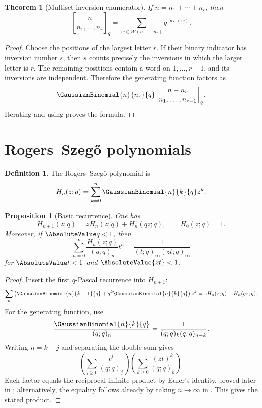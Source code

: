 \documentclass[11pt,a4paper,oneside,openany]{book}
\newtheorem{theorem}{Theorem}[chapter]
\newtheorem{proposition}[proposition]{Proposition}
\theoremstyle{definition}
\newtheorem{definition}[definition]{Definition}
\theoremstyle{remark}
\newcommand{\inv}{\operatorname{inv}}
\begin{document}
\begin{theorem}[Multiset inversion enumerator]\label{thm:qmult-inversions}
If $n=n_1+\cdots+n_r$, then
\[
 \genfrac{[}{]}{0pt}{}{n}{n_1,\dots,n_r}_q
 =\sum_{w\in\mathcal W(n_1,\dots,n_r)}q^{\inv(w)}.
\]
\end{theorem}

\begin{proof}
Choose the positions of the largest letter $r$.  If their binary indicator has inversion number $s$, then $s$ counts precisely the inversions in which the larger letter is $r$.  The remaining positions contain a word on $1,\dots,r-1$, and its inversions are independent.  Therefore the generating function factors as
\[
 \GaussianBinomial{n}{n_r}{q}
 \genfrac{[}{]}{0pt}{}{n-n_r}{n_1,\dots,n_{r-1}}_q.
\]
Iterating and using  proves the formula.
\end{proof}

\section{Rogers--Szeg\H{o} polynomials}

\begin{definition}
The Rogers--Szeg\H{o} polynomial is
\[
 H_n(z;q)=\sum_{k=0}^{n}\GaussianBinomial{n}{k}{q} z^k.
\]
\end{definition}

\begin{proposition}[Basic recurrence]\label{prop:rogers-szego-recurrence}
One has
\[
 H_{n+1}(z;q)=zH_n(z;q)+H_n(qz;q),
 \qquad H_0(z;q)=1.
\]
Moreover, if $\AbsoluteValue q<1$, then
\[
 \sum_{n=0}^{\infty}\frac{H_n(z;q)}{(q;q)_n}t^n
 =\frac1{(t;q)_\infty(zt;q)_\infty}
\]
for $\AbsoluteValue t<1$ and $\AbsoluteValue{zt}<1$.
\end{proposition}

\begin{proof}
Insert the first $q$-Pascal recurrence into $H_{n+1}$:
\[
 \sum_k\left(\GaussianBinomial{n}{k-1}{q}+q^k\GaussianBinomial{n}{k}{q}\right)z^k
 =zH_n(z;q)+H_n(qz;q).
\]
For the generating function, use
\[
 \frac{\GaussianBinomial{n}{k}{q}}{(q;q)_n}=\frac1{(q;q)_k(q;q)_{n-k}}.
\]
Writing $n=k+j$ and separating the double sum gives
\[
 \left(\sum_{j\ge0}\frac{t^j}{(q;q)_j}\right)
 \left(\sum_{k\ge0}\frac{(zt)^k}{(q;q)_k}\right).
\]
Each factor equals the reciprocal infinite product by Euler's identity, proved later in ; alternatively, the equality follows already by taking $n\to\infty$ in .  This gives the stated product.
\end{proof}
\end{document}
